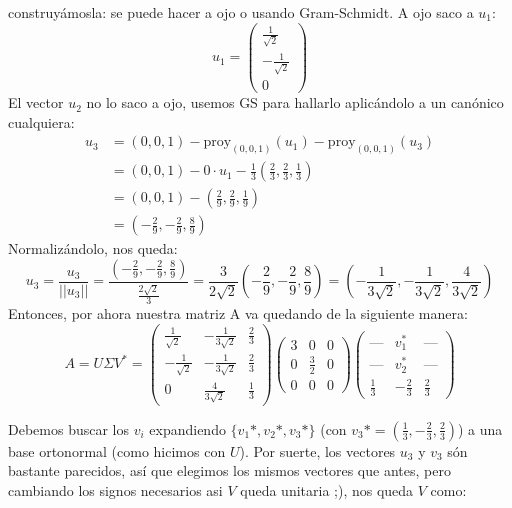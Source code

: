 construyámosla: se puede hacer a ojo o usando Gram-Schmidt. A ojo saco a $u_1$:
$$
u_1 = \begin{pmatrix} \frac{1}{\sqrt{2}} \\ -\frac{1}{\sqrt{2}} \\ 0\end{pmatrix}
$$
El vector $u_2$ no lo saco a ojo, usemos GS para hallarlo aplicándolo a un canónico cualquiera:
$$
\begin{align*}
u_3 &= (0,0,1) - \text{proy}_{(0,0,1)}(u_1) - \text{proy}_{(0,0,1)}(u_3) \\
    &= (0,0,1) - 0 \cdot u_1 - \frac{1}{3} (\frac{2}{3}, \frac{2}{3}, \frac{1}{3}) \\
    &= (0,0,1) - (\frac{2}{9}, \frac{2}{9}, \frac{1}{9}) \\
    &= (-\frac{2}{9}, -\frac{2}{9}, \frac{8}{9})
\end{align*}
$$
Normalizándolo, nos queda:
$$
u_3 = \frac{u_3}{||u_3||} = \frac{(-\frac{2}{9}, -\frac{2}{9}, \frac{8}{9})}{ \frac{2 \sqrt{2}}{3}} = \frac{3}{2 \sqrt{2}} (-\frac{2}{9}, -\frac{2}{9}, \frac{8}{9}) = (-\frac{1}{3\sqrt{2}},-\frac{1}{3\sqrt{2}},\frac{4}{3\sqrt{2}})
$$
Entonces, por ahora nuestra matriz A va quedando de la siguiente manera:
$$
A = U \Sigma V^*
= \begin{pmatrix}
    \frac{1}{\sqrt{2}} & -\frac{1}{3 \sqrt{2}} & \frac{2}{3} \\
    -\frac{1}{\sqrt{2}} & -\frac{1}{3 \sqrt{2}} & \frac{2}{3} \\
    0 & \frac{4}{3 \sqrt{2}} & \frac{1}{3}
    \end{pmatrix}
    \begin{pmatrix}
    3 & 0 & 0 \\
    0 & \frac{3}{2} & 0  \\
    0 & 0 & 0
    \end{pmatrix}
    \begin{pmatrix}
    \text{---} & v_1^* & \text{---} \\
    \text{---} & v_2^* & \text{---} \\
    \frac{1}{3} & -\frac{2}{3} & \frac{2}{3}
    \end{pmatrix}
$$

Debemos buscar los $v_i$ expandiendo $\{v_1*, v_2*, v_3*\}$ (con $v_3* = (\frac{1}{3} , -\frac{2}{3} , \frac{2}{3} )$) a una base ortonormal (como hicimos con $U$). Por suerte, los vectores $u_3$ y $v_3$ són bastante parecidos, así que elegimos los mismos vectores que antes, pero cambiando los signos necesarios asi $V$ queda unitaria ;), nos queda $V$ como:

